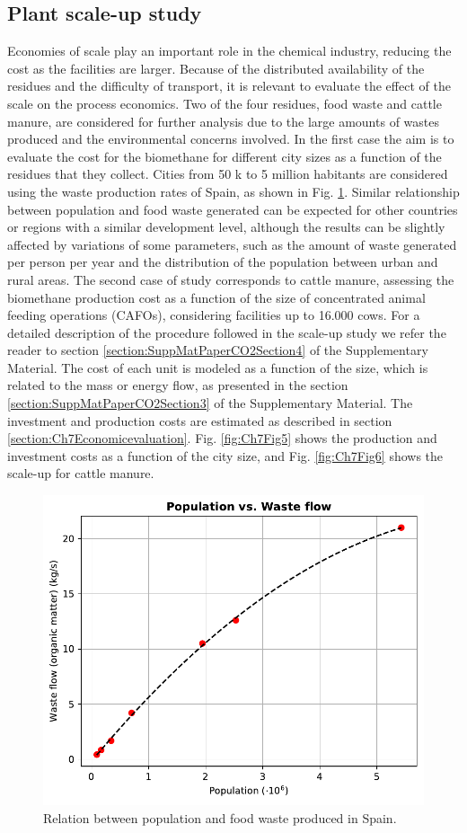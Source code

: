 \begin{refsection}[referencesCh7]
\subsection{Plant scale-up study}
Economies of scale play an important role in the chemical industry, reducing the cost as the facilities are larger. Because of the distributed availability of the residues and the difficulty of transport, it is relevant to evaluate the effect of the scale on the process economics. Two of the four residues, food waste and cattle manure, are considered for further analysis due to the large amounts of wastes produced and the environmental concerns involved. In the first case the aim is to evaluate the cost for the biomethane for different city sizes as a function of the residues that they collect. Cities from 50 k to 5 million habitants are considered using the waste production rates of Spain, as shown in Fig. \ref{fig:Ch7Fig4}. Similar relationship between population and food waste generated can be expected for other countries or regions with a similar development level, although the results can be slightly affected by variations of some parameters, such as the amount of waste generated per person per year and the distribution of the population between urban and rural areas. The second case of study corresponds to cattle manure, assessing the biomethane production cost as a function of the size of concentrated animal feeding operations (CAFOs), considering facilities up to 16.000 cows. For a detailed description of the procedure followed in the scale-up study we refer the reader to section \ref{section:SuppMatPaperCO2Section4} of the Supplementary Material. The cost of each unit is modeled as a function of the size, which is related to the mass or energy flow, as presented in the section \ref{section:SuppMatPaperCO2Section3} of the Supplementary Material. The investment and production costs are estimated as described in section \ref{section:Ch7Economicevaluation}. Fig. \ref{fig:Ch7Fig5} shows the production and investment costs as a function of the city size, and Fig. \ref{fig:Ch7Fig6} shows the scale-up for cattle manure.

\begin{figure}[h!]
	\centering
	\includegraphics[width=0.7\linewidth, trim={0cm 0cm 0cm 0cm},clip]{gfx/Chapter7/Figure4.pdf} 
	\caption{Relation between population and food waste produced in Spain.}
	\label{fig:Ch7Fig4}
\end{figure}


\end{refsection}
